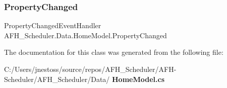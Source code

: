 \subsubsection{PropertyChanged}
{\footnotesize\ttfamily Property\+Changed\+Event\+Handler A\+F\+H\+\_\+\+Scheduler.\+Data.\+Home\+Model.\+Property\+Changed}



The documentation for this class was generated from the following file\+:\begin{DoxyCompactItemize}
\item 
C\+:/\+Users/jnestoss/source/repos/\+A\+F\+H\+\_\+\+Scheduler/\+A\+F\+H-\/\+Scheduler/\+A\+F\+H\+\_\+\+Scheduler/\+Data/\textbf{ Home\+Model.\+cs}\end{DoxyCompactItemize}
